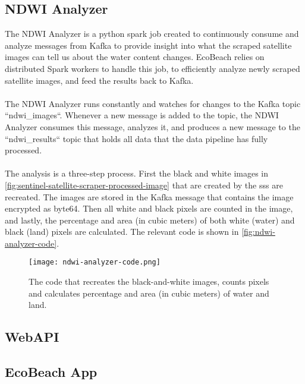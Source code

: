 \subsection{NDWI Analyzer}\label{subsec:ndwi-analyzer}

The NDWI Analyzer is a python spark job created to continuously consume and analyze messages from Kafka to provide insight into what the scraped satellite images can tell us about the water content changes. EcoBeach relies on distributed Spark workers to handle this job, to efficiently analyze newly scraped satellite images, and feed the results back to Kafka.\\\\
\noindent
The NDWI Analyzer runs constantly and watches for changes to the Kafka topic ``ndwi\_images``. Whenever a new message is added to the topic, the NDWI Analyzer consumes this message, analyzes it, and produces a new message to the ``ndwi\_results`` topic that holds all data that the data pipeline has fully processed.\\\\
\noindent
The analysis is a three-step process. First the black and white images in \autoref{fig:sentinel-satellite-scraper-processed-image} that are created by the \acrshort{sss} are recreated. The images are stored in the Kafka message that contains the image encrypted as byte64. Then all white and black pixels are counted in the image, and lastly, the percentage and area (in cubic meters) of both white (water) and black (land) pixels are calculated. The relevant code is shown in \autoref{fig:ndwi-analyzer-code}.

\begin{figure}[h!]
    \centering
    \texttt{[image: ndwi-analyzer-code.png]}
    \caption{The code that recreates the black-and-white images, counts pixels and calculates percentage and area (in cubic meters) of water and land.}
    \label{fig:ndwi-analyzer-code}
\end{figure}

\subsection{WebAPI}

\subsection{EcoBeach App}\label{subsec:ecobeach-app}





